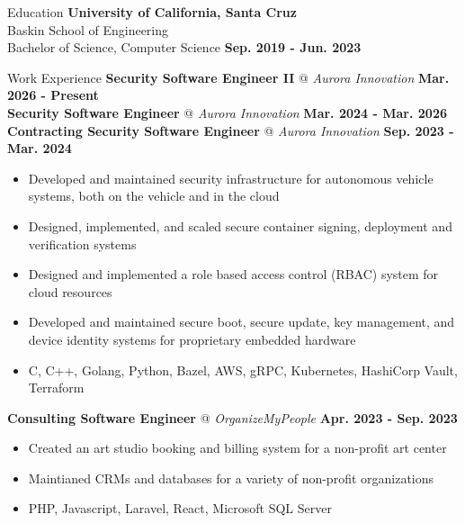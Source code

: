 \documentclass{resume} %
\begin{document}
\begin{rSection}{Education}
    \textbf{University of California, Santa Cruz}
    \\ Baskin School of Engineering
    \\ Bachelor of Science, Computer Science
    \hfill{\textbf {Sep. 2019 - Jun. 2023}}
\end{rSection}

\begin{rSection}{Work Experience}
    {\textbf{Security Software Engineer II}} @ \textit{{Aurora Innovation}}
    \hfill{\textbf {Mar. 2026 - Present}}
    \\{\textbf{Security Software Engineer}} @ \textit{{Aurora Innovation}}
    \hfill{\textbf {Mar. 2024 - Mar. 2026}}
    \\{\textbf{Contracting Security Software Engineer}} @ \textit{{Aurora Innovation}}
    \hfill{\textbf {Sep. 2023 - Mar. 2024}}
    \vspace{-0.65em}
    \begin{itemize}[noitemsep]
        \item Developed and maintained security infrastructure for autonomous vehicle systems, both on the vehicle and in the cloud
        \item Designed, implemented, and scaled secure container signing, deployment and verification systems
        \item Designed and implemented a role based access control (RBAC) system for cloud resources
        \item Developed and maintained secure boot, secure update, key management, and device identity systems for proprietary embedded hardware
        \item C, C++, Golang, Python, Bazel, AWS, gRPC, Kubernetes, HashiCorp Vault, Terraform
    \end{itemize}

    {\textbf{Consulting Software Engineer} @ \textit{OrganizeMyPeople}}
    \hfill{\textbf {Apr. 2023 - Sep. 2023}}
    \vspace{-0.65em}
    \begin{itemize}[noitemsep]
        \item Created an art studio booking and billing system for a non-profit art center
        \item Maintianed CRMs and databases for a variety of non-profit organizations
        \item PHP, Javascript, Laravel, React, Microsoft SQL Server
    \end{itemize}


\end{rSection}
\end{document}
